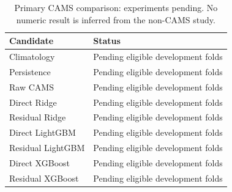 \begin{table}[t]\centering\caption{Primary CAMS comparison: experiments pending. No numeric result is inferred from the non-CAMS study.}
\begin{tabular}{lp{}}\toprule Candidate & Status\\\midrule
Climatology & Pending eligible development folds\\
Persistence & Pending eligible development folds\\
Raw CAMS & Pending eligible development folds\\
Direct Ridge & Pending eligible development folds\\
Residual Ridge & Pending eligible development folds\\
Direct LightGBM & Pending eligible development folds\\
Residual LightGBM & Pending eligible development folds\\
Direct XGBoost & Pending eligible development folds\\
Residual XGBoost & Pending eligible development folds\\
\bottomrule\end{tabular}\end{table}
